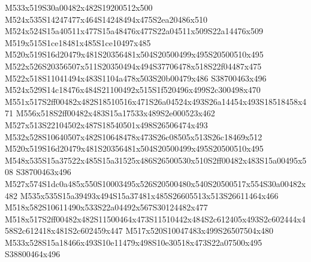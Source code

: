 \documentclass{article}
\begin{document}
\begin{multicols}{2}



M533x519S30a00482x482S19200512x500 M524x535S14247477x464S14248494x475S2ea20486x510 M524x524S15a40511x477S15a48476x477S22a04511x509S22a14476x509 M519x515S1ce18481x485S1ce10497x485 M520x519S16d20479x481S20356481x504S20500499x495S20500510x495 M522x526S20356507x511S20350494x494S37706478x518S22f04487x475 M522x518S11041494x483S1104a478x503S20b00479x486 S38700463x496 M524x529S14c18476x484S21100492x515S1f520496x499S2c300498x470 M551x517S2ff00482x482S18510516x471S26a04524x493S26a14454x493S18518458x471 M556x518S2ff00482x483S15a17533x489S2e000523x462 M527x513S22104502x487S18540501x498S26506474x493 M532x528S10640507x482S10648478x473S26c08505x513S26c18469x512 M520x519S16d20479x481S20356481x504S20500499x495S20500510x495 M548x535S15a37522x485S15a31525x486S26500530x510S2ff00482x483S15a00495x508 S38700463x496 M527x574S1dc0a485x550S10003495x526S20500480x540S20500517x554S30a00482x482 M535x535S15a39493x494S15a37481x485S26605513x513S26611464x466 M518x582S10611490x533S22a04492x567S30124482x477 M518x517S2ff00482x482S11500464x473S11510442x484S2c612405x493S2c602444x458S2c612418x481S2c602459x447 M517x520S10047483x499S26507504x480 M533x528S15a18466x493S10e11479x498S10e30518x473S22a07500x495 S38800464x496







\end{multicols}
\end{document}
